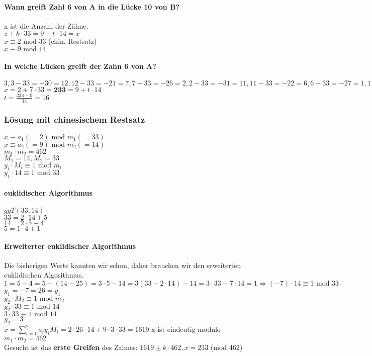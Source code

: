 \paragraph{Wann greift Zahl 6 von A in die Lücke 10 von B?} x ist die Anzahl der Zähne. \\
$z+k\cdot 33=9+t\cdot 14=x$\\
$x \equiv 2 \textrm{ mod } 33$ (chin. Restsatz)\\
$x \equiv 9 \textrm{ mod } 14$\\

\paragraph{In welche Lücken greift der Zahn 6 von A?}  
$3, 3-33=-30=12, 12-33=-21=7, 7-33=-26=2, 2-33=-31=11, 11-33=-22=6, 6-33=-27=1, 1-33=-32=\underline{\textbf{10}}$\\
$x=2+7\cdot 33=\underline{\textbf{233}}=9+t\cdot 14$\\
$t=\frac{233-9}{14}=16$

\subsubsection{Lösung mit chinesischem Restsatz}
$x \equiv a_1 (=2) \textrm{ mod } m_1 (=33)$\\
$x \equiv a_2 (=9) \textrm{ mod } m_2 (=14)$\\
$m_1 \cdot  m_2 = 462$\\
$M_1=14, M_2=33$\\
$y_i \cdot  M_i \equiv 1 \textrm{ mod } m_i$ \\
$y_1 \cdot  14 \equiv 1 \textrm{ mod } 33$

\paragraph{euklidischer Algorithmus} $ggT(33,14)$\\
$33=2\cdot 14+5$\\
$14=2\cdot 5+4$\\
$5=1\cdot 4+1$

\paragraph{Erweiterter euklidischer Algorithmus} Die bisherigen Werte kannten wir schon, daher brauchen wir den erweiterten euklidischen Algorithmus. \\
$1=5-4=5-(14-25)=3\cdot 5-14=3(33-2\cdot 14)-14=3\cdot 33-7\cdot 14=1 \Rightarrow (-7)\cdot 14 \equiv 1 \textrm{ mod } 33$\\
$y_1=-7=26=y_1$\\
$y_2 \cdot  M_2 \equiv 1 \textrm{ mod } m_2$\\
$y_2 \cdot  33 \equiv 1 \textrm{ mod } 14$\\
$3 \cdot  33 \equiv 1 \textrm{ mod } 14$\\
$y_2 = 3$\\
$x=\sum_{i=1}^{2} a_i y_i M_i = 2 \cdot  26 \cdot  14 + 9 \cdot  3 \cdot  33 = 1619$
x ist eindeutig modulo $m_1 \cdot  m_2 = 462$\\
Gesucht ist das \textbf{erste Greifen} des Zahnes: $1619 \pm k \cdot  462, x=233$ (mod 462)
